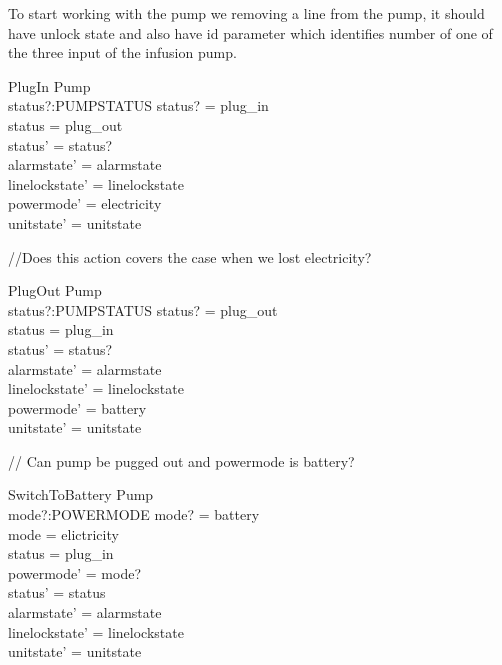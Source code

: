 \documentclass{article}
\begin{document}
	To start working with the pump we removing a line from the pump, it should have unlock state
	and also have id parameter which identifies number of one of the
	three input of the infusion pump.	
	
	\begin{schema}{PlugIn}
		\Delta Pump\\
		status?:PUMPSTATUS
	\where
		status? = plug\_in \\
		status = plug\_out \\
		status' = status? \\
		alarmstate' = alarmstate \\
		linelockstate' = linelockstate \\
		powermode' =  electricity \\
		unitstate' = unitstate \\
	\end{schema}
	
	//Does this action covers the case when we lost electricity?
	
	\begin{schema}{PlugOut}
		\Delta Pump\\
		status?:PUMPSTATUS
	\where
		status? = plug\_out \\
		status = plug\_in \\
		status' = status? \\
		alarmstate' = alarmstate \\
		linelockstate' = linelockstate \\
		powermode' =  battery \\
		unitstate' = unitstate \\
	\end{schema}
	
	// Can pump be pugged out and powermode is battery?	
	
	\begin{schema}{SwitchToBattery}
		\Delta Pump\\
		mode?:POWERMODE
	\where 
		mode? = battery \\
		mode = elictricity \\
		status = plug\_in \\
		powermode' = mode? \\
		status' = status \\
		alarmstate' = alarmstate \\
		linelockstate' = linelockstate \\
		unitstate' = unitstate \\
	\end{schema}
	
\end{document}
